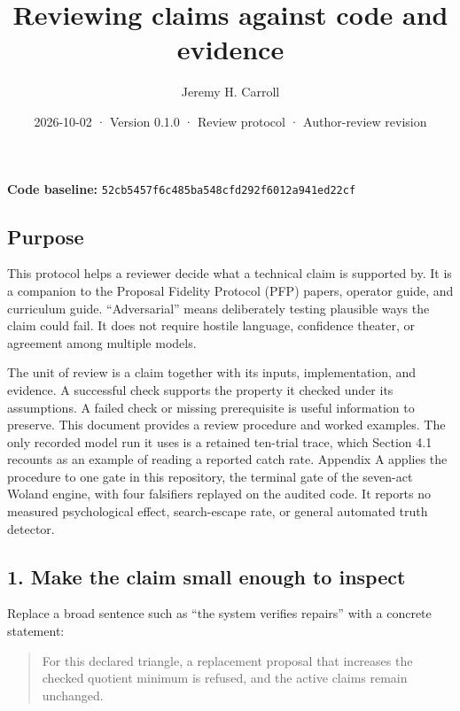 \documentclass[
  11pt,
]{article}
\title{Reviewing claims against code and evidence}
\author{Jeremy H. Carroll}
\date{2026-10-02 · Version 0.1.0 · Review protocol · Author-review
revision}
\begin{document}
\makeatletter
\begin{center}
{\LARGE \@title\par}
\vspace{0.8em}
{\normalsize \@author\par}
\vspace{0.5em}
{\small \@date\par}
\end{center}
\makeatother

\textbf{Code baseline:}
\nolinkurl{52cb5457f6c485ba548cfd292f6012a941ed22cf}

\subsection{Purpose}\label{purpose}

This protocol helps a reviewer decide what a technical claim is
supported by. It is a companion to the Proposal Fidelity Protocol (PFP)
papers, operator guide, and curriculum guide. ``Adversarial'' means
deliberately testing plausible ways the claim could fail. It does not
require hostile language, confidence theater, or agreement among
multiple models.

The unit of review is a claim together with its inputs, implementation,
and evidence. A successful check supports the property it checked under
its assumptions. A failed check or missing prerequisite is useful
information to preserve. This document provides a review procedure and
worked examples. The only recorded model run it uses is a retained
ten-trial trace, which Section 4.1 recounts as an example of reading a
reported catch rate. Appendix A applies the procedure to one gate in
this repository, the terminal gate of the seven-act Woland engine, with
four falsifiers replayed on the audited code. It reports no measured
psychological effect, search-escape rate, or general automated truth
detector.

\subsection{1. Make the claim small enough to
inspect}\label{make-the-claim-small-enough-to-inspect}

Replace a broad sentence such as ``the system verifies repairs'' with a
concrete statement:

\begin{quote}
For this declared triangle, a replacement proposal that increases the
checked quotient minimum is refused, and the active claims remain
unchanged.
\end{quote}
\end{document}

